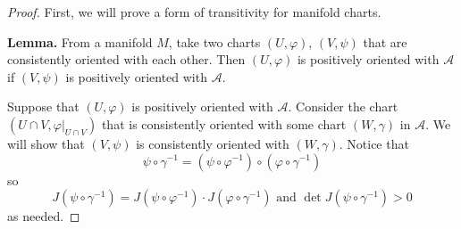 \documentclass{article}
\theoremstyle{plain} %
\numberwithin{thm}{section} %
\theoremstyle{definition}
\begin{document}
        \begin{proof}

            First, we will prove a form of transitivity for manifold charts.

            \textbf{Lemma.} From a manifold \(M\), take two charts \((U, \varphi)\), \((V, \psi)\) that are consistently oriented with each other. Then \((U ,\varphi)\) is positively oriented with \(\mathcal{A}\) if \((V, \psi)\) is positively oriented with \(\mathcal{A}\).

            Suppose that \((U, \varphi)\) is positively oriented with \(\mathcal{A}\). Consider the chart \((U \cap V, \varphi | _{U \cap V})\) that is consistently oriented with some chart \((W, \gamma)\) in \(\mathcal{A}\). We will show that \((V, \psi)\) is consistently oriented with \((W, \gamma)\). Notice that
            \[
                \psi \circ \gamma^{-1} = (\psi \circ \varphi^{-1}) \circ (\varphi \circ \gamma^{-1})
            \]
            so
            \[
                J (\psi \circ \gamma^{-1}) = J (\psi \circ \varphi^{-1}) \cdot J (\varphi \circ \gamma^{-1}) \text{ and } \det J(\psi \circ \gamma^{-1}) > 0
            \]
            as needed.


\end{proof}
\end{document}
